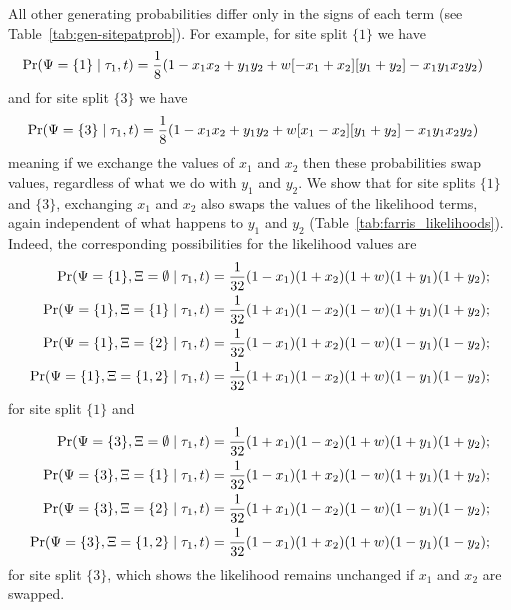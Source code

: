 All other generating probabilities differ only in the signs of each term (see Table~\ref{tab:gen-sitepatprob}).
For example, for site split $\{1\}$ we have
\begin{align*}
    \Pr(\Psi=\{1\}\mid \tau_1, t) & = \frac{1}{8} (1 - x_1x_2 +  y_1y_2 +  w[-x_1 + x_2][y_1 + y_2] - x_1y_1x_2y_2)
\end{align*}
and for site split $\{3\}$ we have
\begin{align*}
    \Pr(\Psi=\{3\}\mid \tau_1, t) & = \frac{1}{8} (1 - x_1x_2 +  y_1y_2 +  w[x_1 - x_2][y_1 + y_2] - x_1y_1x_2y_2)
\end{align*}
meaning if we exchange the values of $x_1$ and $x_2$ then these probabilities swap values, regardless of what we do with $y_1$ and $y_2$.
We show that for site splits $\{1\}$ and $\{3\}$, exchanging $x_1$ and $x_2$ also swaps the values of the likelihood terms, again independent of what happens to $y_1$ and $y_2$ (Table~\ref{tab:farris_likelihoods}).
Indeed, the corresponding possibilities for the likelihood values are
\begin{align*}
    \Pr(\Psi=\{1\}, \Xi=\emptyset \mid \tau_1, t) &= \frac{1}{32}(1-x_1)(1+x_2)(1+w)(1+y_1)(1+y_2); \\
    \Pr(\Psi=\{1\}, \Xi=\{1\} \mid \tau_1, t) &= \frac{1}{32}(1+x_1)(1-x_2)(1-w)(1+y_1)(1+y_2); \\
    \Pr(\Psi=\{1\}, \Xi=\{2\} \mid \tau_1, t) &= \frac{1}{32}(1-x_1)(1+x_2)(1-w)(1-y_1)(1-y_2); \\
    \Pr(\Psi=\{1\}, \Xi=\{1,2\} \mid \tau_1, t) &= \frac{1}{32}(1+x_1)(1-x_2)(1+w)(1-y_1)(1-y_2);
\end{align*}
for site split $\{1\}$ and
\begin{align*}
    \Pr(\Psi=\{3\}, \Xi=\emptyset \mid \tau_1, t) &= \frac{1}{32}(1+x_1)(1-x_2)(1+w)(1+y_1)(1+y_2); \\
    \Pr(\Psi=\{3\}, \Xi=\{1\} \mid \tau_1, t) &= \frac{1}{32}(1-x_1)(1+x_2)(1-w)(1+y_1)(1+y_2); \\
    \Pr(\Psi=\{3\}, \Xi=\{2\} \mid \tau_1, t) &= \frac{1}{32}(1+x_1)(1-x_2)(1-w)(1-y_1)(1-y_2); \\
    \Pr(\Psi=\{3\}, \Xi=\{1,2\} \mid \tau_1, t) &= \frac{1}{32}(1-x_1)(1+x_2)(1+w)(1-y_1)(1-y_2);
\end{align*}
for site split $\{3\}$, which shows the likelihood remains unchanged if $x_1$ and $x_2$ are swapped.

